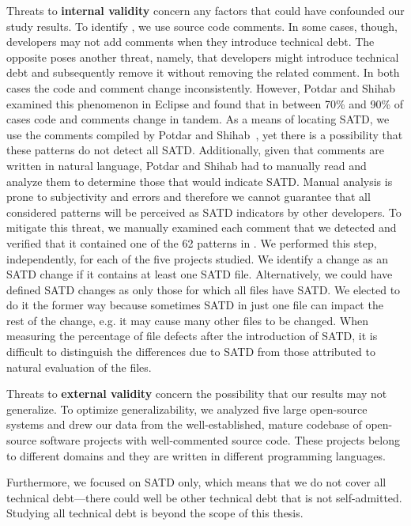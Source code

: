 Threats  to {\bf  internal validity}  concern any factors that could have confounded our study results. To identify \SATD, we use source code comments. In some cases, though, developers may not add comments when they introduce technical debt. The opposite poses another threat, namely, that developers might introduce technical debt and subsequently remove it without removing the related comment. In both cases the code and comment change inconsistently. However, Potdar and Shihab~\cite{ICSM_PotdarS14} examined this phenomenon in Eclipse and found that in between 70\% and 90\% of cases code and comments change in tandem. As a means of locating SATD, we use the comments compiled by Potdar and Shihab~\cite{ICSM_PotdarS14}, yet there is a possibility that these patterns do not detect all SATD. Additionally, given that comments are written in natural language, Potdar and Shihab had to manually read and analyze them to determine those that would indicate SATD. Manual analysis is prone to subjectivity and errors and therefore we cannot guarantee that all considered patterns will be perceived as SATD indicators by other developers. To mitigate this threat, we manually examined each comment that we detected and verified that it contained one of the 62 patterns in \cite{ICSM_PotdarS14}. We performed this step, independently, for each of the five projects studied. We identify a change as an SATD change if it contains at least one SATD file. Alternatively, we could have defined SATD changes as only those for which all files have SATD. We elected to do it the former way because sometimes SATD in just one file can impact the rest of the change, e.g. it may cause many other files to be changed. When measuring the percentage of file defects after the introduction of SATD, it is difficult to distinguish the differences due to SATD from those attributed to natural evaluation of the files.



Threats  to {\bf external validity} concern the possibility that our results may not generalize. To optimize generalizability, we analyzed five large open-source systems and drew our data from the well-established, mature codebase of open-source software projects with well-commented source code. These projects belong to different domains and they are written in different programming languages.


Furthermore, we focused on SATD only, which means that we do not cover all technical debt---there could well be other technical debt that is not self-admitted. Studying all technical debt is beyond the scope of this thesis.





